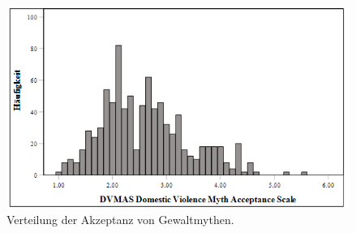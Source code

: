 \begin{figure}[htb]
    \centering
        \includegraphics[width=0.8\linewidth]{Histogramm - DVMAS.png}
        \caption[Histogramm Altersverteilung]{Verteilung der Akzeptanz von Gewaltmythen.}
        \label{Histogramm DVMAS}
\end{figure}

